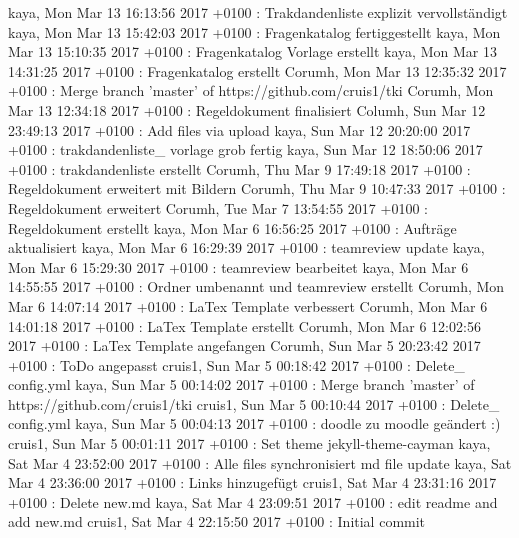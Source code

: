 kaya, Mon Mar 13 16:13:56 2017 +0100 : Trakdandenliste explizit vervollständigt
kaya, Mon Mar 13 15:42:03 2017 +0100 : Fragenkatalog fertiggestellt
kaya, Mon Mar 13 15:10:35 2017 +0100 : Fragenkatalog Vorlage erstellt
kaya, Mon Mar 13 14:31:25 2017 +0100 : Fragenkatalog erstellt
Corumh, Mon Mar 13 12:35:32 2017 +0100 : Merge branch 'master' of https://github.com/cruis1/tki
Corumh, Mon Mar 13 12:34:18 2017 +0100 : Regeldokument finalisiert
Columh, Sun Mar 12 23:49:13 2017 +0100 : Add files via upload
kaya, Sun Mar 12 20:20:00 2017 +0100 : trakdandenliste\_ vorlage grob fertig
kaya, Sun Mar 12 18:50:06 2017 +0100 : trakdandenliste erstellt
Corumh, Thu Mar 9 17:49:18 2017 +0100 : Regeldokument erweitert mit Bildern
Corumh, Thu Mar 9 10:47:33 2017 +0100 : Regeldokument erweitert
Corumh, Tue Mar 7 13:54:55 2017 +0100 : Regeldokument erstellt
kaya, Mon Mar 6 16:56:25 2017 +0100 : Aufträge aktualisiert
kaya, Mon Mar 6 16:29:39 2017 +0100 : teamreview update
kaya, Mon Mar 6 15:29:30 2017 +0100 : teamreview bearbeitet
kaya, Mon Mar 6 14:55:55 2017 +0100 : Ordner umbenannt und teamreview erstellt
Corumh, Mon Mar 6 14:07:14 2017 +0100 : LaTex Template verbessert
Corumh, Mon Mar 6 14:01:18 2017 +0100 : LaTex Template erstellt
Corumh, Mon Mar 6 12:02:56 2017 +0100 : LaTex Template angefangen
Corumh, Sun Mar 5 20:23:42 2017 +0100 : ToDo angepasst
cruis1, Sun Mar 5 00:18:42 2017 +0100 : Delete\_ config.yml
kaya, Sun Mar 5 00:14:02 2017 +0100 : Merge branch 'master' of https://github.com/cruis1/tki
cruis1, Sun Mar 5 00:10:44 2017 +0100 : Delete\_ config.yml
kaya, Sun Mar 5 00:04:13 2017 +0100 : doodle zu moodle geändert :)
cruis1, Sun Mar 5 00:01:11 2017 +0100 : Set theme jekyll-theme-cayman
kaya, Sat Mar 4 23:52:00 2017 +0100 : Alle files synchronisiert md file update
kaya, Sat Mar 4 23:36:00 2017 +0100 : Links hinzugefügt
cruis1, Sat Mar 4 23:31:16 2017 +0100 : Delete new.md
kaya, Sat Mar 4 23:09:51 2017 +0100 : edit readme and add new.md
cruis1, Sat Mar 4 22:15:50 2017 +0100 : Initial commit



